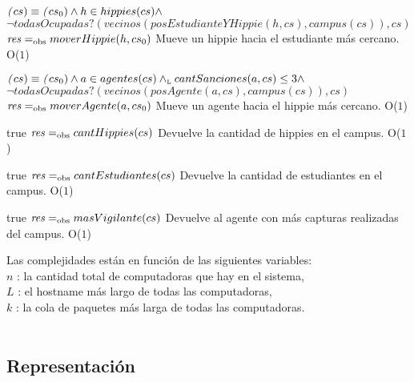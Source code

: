 {$\text{\textit{(}}cs) \equiv \text{\textit{(}}cs_0) \land h \in hippies(cs) \land $\\$ \neg todasOcupadas?(vecinos(posEstudianteYHippie(h, cs), campus(cs)), cs)$}
{$\text{\textit{res}} =_{\mathrm{obs}} moverHippie(h, cs_0)$}
{Mueve un hippie hacia el estudiante más cercano.}
{O($1$)}
{}


{$\text{\textit{(}}cs) \equiv \text{\textit{(}}cs_0) \land a \in agentes(cs) \land_{\mathrm{\scriptscriptstyle{L}}} cantSanciones(a, cs) \leq 3 \land $\\$ \neg todasOcupadas?(vecinos(posAgente(a, cs), campus(cs)), cs)$}
{$\text{\textit{res}} =_{\mathrm{obs}} moverAgente(a, cs_0)$}
{Mueve un agente hacia el hippie más cercano.}
{O($1$)}
{}

 {true}
 {$\text{\textit{res}} =_{\mathrm{obs}} cantHippies(cs)$}
 {Devuelve la cantidad de hippies en el campus.}
 {O($1$)}
 {}
 
 {true}
 {$\text{\textit{res}} =_{\mathrm{obs}} cantEstudiantes(cs)$}
 {Devuelve la cantidad de estudiantes en el campus.}
 {O($1$)}
 {}
 
 {true}
 {$\text{\textit{res}} =_{\mathrm{obs}} masVigilante(cs)$}
 {Devuelve al agente con más capturas realizadas del campus.}
 {O($1$)}
 {}
 
Las complejidades están en función de las siguientes variables:\\
$n$ : la cantidad total de computadoras que hay en el sistema, \\
$L$ : el hostname más largo de todas las computadoras, \\
$k$ : la cola de paquetes más larga de todas las computadoras. 
\\ \\



\subsection{Representación}


